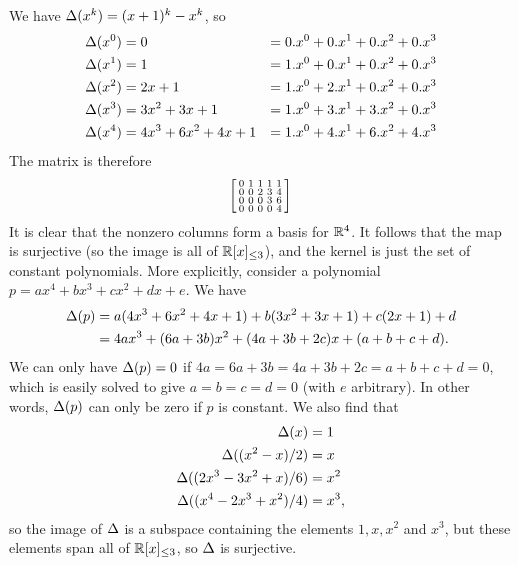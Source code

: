  We have $\Delta(x^k)=(x+1)^k-x^k$, so
 \begin{align*}
  \Delta(x^0) &= 0
           &= 0.x^0 + 0.x^1 + 0.x^2 + 0.x^3 \\
  \Delta(x^1) &= 1
           &= 1.x^0 + 0.x^1 + 0.x^2 + 0.x^3 \\
  \Delta(x^2) &= 2x+1
           &= 1.x^0 + 2.x^1 + 0.x^2 + 0.x^3 \\
  \Delta(x^3) &= 3x^2+3x+1
           &= 1.x^0 + 3.x^1 + 3.x^2 + 0.x^3 \\
  \Delta(x^4) &= 4x^3+6x^2+4x+1
           &= 1.x^0 + 4.x^1 + 6.x^2 + 4.x^3
 \end{align*}
 The matrix is therefore
 \[ \left[\begin{smallmatrix}
     0 & 1 & 1 & 1 & 1 \\
     0 & 0 & 2 & 3 & 4 \\
     0 & 0 & 0 & 3 & 6 \\
     0 & 0 & 0 & 0 & 4
    \end{smallmatrix}\right]
 \]
 It is clear that the nonzero columns form a basis for
 ${\mathbb{R}}^4$.  It follows that the map is surjective (so the
 image is all of ${\mathbb{R}}[x]_{\leq 3}$), and the kernel is just
 the set of constant polynomials.  More explicitly, consider
 a polynomial $p=ax^4+bx^3+cx^2+dx+e$.  We have
 \begin{align*}
   \Delta(p) &=
     a(4x^3+6x^2+4x+1)+ b(3x^2+3x+1) +
     c(2x+1) + d \\
    &= 4ax^3 + (6a+3b)x^2 + (4a+3b+2c)x + (a+b+c+d).
 \end{align*}
 We can only have $\Delta(p)=0$ if
 $4a=6a+3b=4a+3b+2c=a+b+c+d=0$, which is easily solved to
 give $a=b=c=d=0$ (with $e$ arbitrary).  In other words,
 $\Delta(p)$ can only be zero if $p$ is constant.  We also find
 that
 \begin{align*}
  \Delta(x) &= 1 \\
  \Delta((x^2-x)/2) &= x \\
  \Delta((2x^3-3x^2+x)/6) &= x^2 \\
  \Delta((x^4-2x^3+x^2)/4) &= x^3,
 \end{align*}
 so the image of $\Delta$ is a subspace containing the elements
 $1,x,x^2$ and $x^3$, but these elements span all of
 ${\mathbb{R}}[x]_{\leq 3}$, so $\Delta$ is surjective.
\EndDeferredSolution

